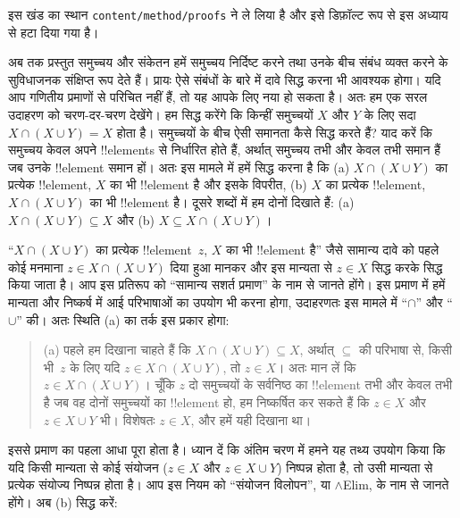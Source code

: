 \documentclass[../../../include/open-logic-section]{subfiles}
\begin{document}

\begin{editorial}
इस खंड का स्थान \verb|content/method/proofs| ने ले लिया है और इसे डिफ़ॉल्ट
रूप से इस अध्याय से हटा दिया गया है।
\end{editorial}

\begin{explain}
अब तक प्रस्तुत समुच्चय और संकेतन हमें समुच्चय निर्दिष्ट करने तथा उनके बीच
संबंध व्यक्त करने के सुविधाजनक संक्षिप्त रूप देते हैं। प्रायः ऐसे संबंधों के
बारे में दावे सिद्ध करना भी आवश्यक होगा। यदि आप गणितीय प्रमाणों से परिचित
नहीं हैं, तो यह आपके लिए नया हो सकता है। अतः हम एक सरल उदाहरण को
चरण-दर-चरण देखेंगे। हम सिद्ध करेंगे कि किन्हीं समुच्चयों $X$ और $Y$ के लिए
सदा $X \cap (X \cup Y) = X$ होता है। समुच्चयों के बीच ऐसी समानता कैसे सिद्ध
करते हैं? याद करें कि समुच्चय केवल अपने !!{element}s से निर्धारित होते हैं,
अर्थात् समुच्चय तभी और केवल तभी समान हैं जब उनके !!{element} समान हों। अतः
इस मामले में हमें सिद्ध करना है कि (a) $X \cap (X \cup Y)$ का प्रत्येक
!!{element}, $X$ का भी !!{element} है और इसके विपरीत, (b) $X$ का प्रत्येक
!!{element}, $X \cap (X \cup Y)$ का भी !!{element} है। दूसरे शब्दों में हम
दोनों दिखाते हैं: (a) $X \cap (X \cup Y) \subseteq X$ और (b) $X \subseteq
X \cap (X \cup Y)$।

``$X \cap (X \cup Y)$ का प्रत्येक !!{element}~$z$, $X$ का भी !!{element}
है'' जैसे सामान्य दावे को पहले कोई मनमाना $z \in X \cap (X \cup Y)$ दिया
हुआ मानकर और इस मान्यता से $z \in X$ सिद्ध करके सिद्ध किया जाता है। आप इस
प्रतिरूप को ``सामान्य सशर्त प्रमाण'' के नाम से जानते होंगे। इस प्रमाण में हमें
मान्यता और निष्कर्ष में आई परिभाषाओं का उपयोग भी करना होगा, उदाहरणतः इस मामले
में ``$\cap$'' और ``$\cup$'' की। अतः स्थिति (a) का तर्क इस प्रकार होगा:

\begin{quote}
(a) पहले हम दिखाना चाहते हैं कि $X \cap (X \cup Y) \subseteq X$, अर्थात्
$\subseteq$ की परिभाषा से, किसी भी~$z$ के लिए यदि $z \in X \cap (X \cup
Y)$, तो $z \in X$। अतः मान लें कि $z \in X \cap (X \cup Y)$। चूँकि $z$
दो समुच्चयों के सर्वनिष्ठ का !!{element} तभी और केवल तभी है जब वह दोनों
समुच्चयों का !!{element} हो, हम निष्कर्षित कर सकते हैं कि $z \in X$ और $z
\in X \cup Y$ भी। विशेषतः $z \in X$, और हमें यही दिखाना था।
\end{quote}

इससे प्रमाण का पहला आधा पूरा होता है। ध्यान दें कि अंतिम चरण में हमने यह
तथ्य उपयोग किया कि यदि किसी मान्यता से कोई संयोजन ($z \in X$ और $z \in X
\cup Y$) निष्पन्न होता है, तो उसी मान्यता से प्रत्येक संयोज्य निष्पन्न होता
है। आप इस नियम को ``संयोजन विलोपन'', या $\land$Elim, के नाम से जानते होंगे।
अब (b) सिद्ध करें:


\end{explain}
\end{document}
